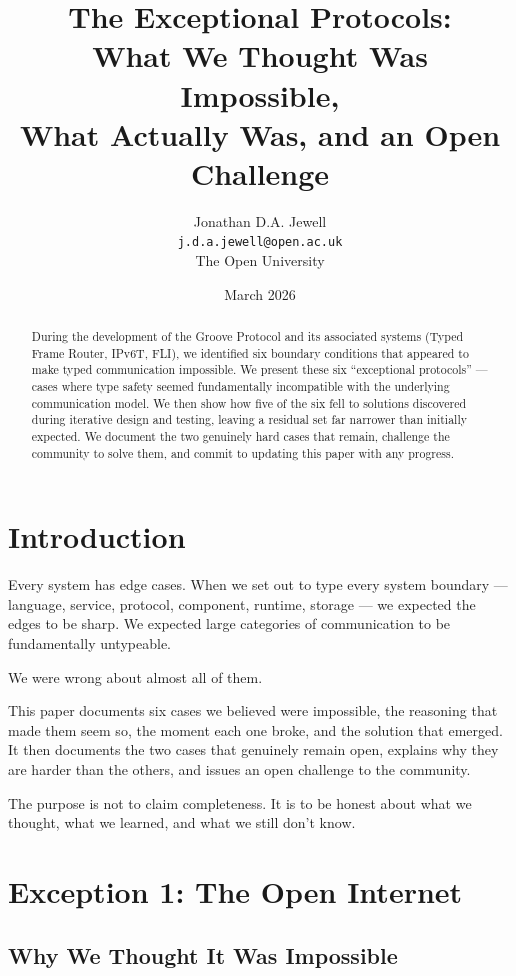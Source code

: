 \documentclass[11pt,a4paper]{article}
\title{The Exceptional Protocols:\\
What We Thought Was Impossible,\\
What Actually Was, and an Open Challenge}
\author{Jonathan D.A. Jewell\\
\texttt{j.d.a.jewell@open.ac.uk}\\
The Open University}
\date{March 2026}
\begin{document}
\maketitle

\begin{abstract}
During the development of the Groove Protocol and its associated
systems (Typed Frame Router, IPv6T, FLI), we identified six boundary
conditions that appeared to make typed communication impossible. We
present these six ``exceptional protocols'' --- cases where type safety
seemed fundamentally incompatible with the underlying communication
model. We then show how five of the six fell to solutions discovered
during iterative design and testing, leaving a residual set far narrower
than initially expected. We document the two genuinely hard cases that
remain, challenge the community to solve them, and commit to updating
this paper with any progress.
\end{abstract}

\section{Introduction}

Every system has edge cases. When we set out to type every system
boundary --- language, service, protocol, component, runtime, storage
\cite{boundaries2026} --- we expected the edges to be sharp. We expected
large categories of communication to be fundamentally untypeable.

We were wrong about almost all of them.

This paper documents six cases we believed were impossible, the
reasoning that made them seem so, the moment each one broke, and the
solution that emerged. It then documents the two cases that genuinely
remain open, explains why they are harder than the others, and issues
an open challenge to the community.

The purpose is not to claim completeness. It is to be honest about what
we thought, what we learned, and what we still don't know.

\section{Exception 1: The Open Internet}
\label{sec:wan}

\subsection{Why We Thought It Was Impossible}
\end{document}
